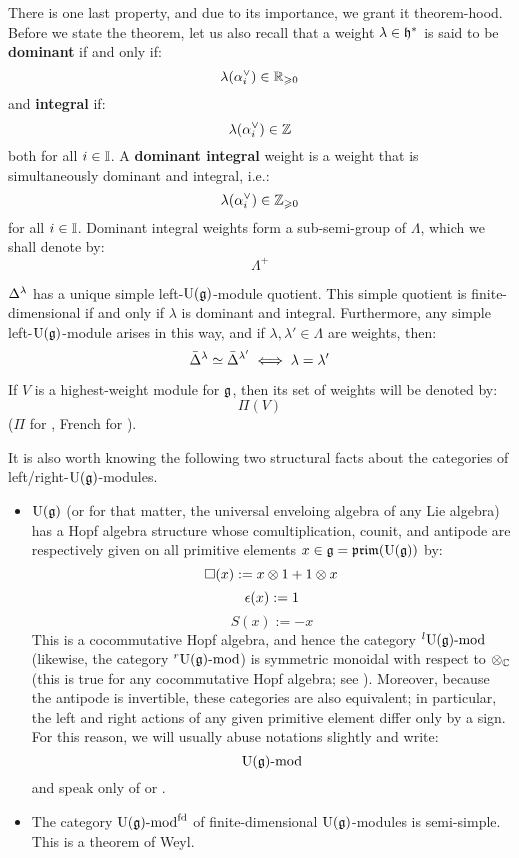         There is one last property, and due to its importance, we grant it theorem-hood. Before we state the theorem, let us also recall that a weight $\lambda \in \mathfrak{h}^*$ is said to be \textbf{dominant} if and only if:
            $$\lambda(\alpha_i^{\vee}) \in \mathbb{R}_{\geqslant 0}$$
        and \textbf{integral} if:
            $$\lambda(\alpha_i^{\vee}) \in \mathbb{Z}$$
        both for all $i \in \mathbb{I}$. A \textbf{dominant integral} weight is a weight that is simultaneously dominant and integral, i.e.:
            $$\lambda(\alpha_i^{\vee}) \in \mathbb{Z}_{\geqslant 0}$$
        for all $i \in \mathbb{I}$. Dominant integral weights form a sub-semi-group of $\Lambda$, which we shall denote by:
            $$\Lambda^+$$
        \begin{theorem} \label{theorem: classification_of_finite_dimensional_simple_modules_over_finite_dimensional_simple_lie_algebras}
            $\Delta^{\lambda}$ has a unique simple left-$\mathrm{U}(\mathfrak{g})$-module quotient. This simple quotient is finite-dimensional if and only if $\lambda$ is dominant and integral. Furthermore, any simple left-$\mathrm{U}(\mathfrak{g})$-module arises in this way, and if $\lambda, \lambda' \in \Lambda$ are weights, then:
                $$\bar{\Delta}^{\lambda} \simeq \bar{\Delta}^{\lambda'} \iff \lambda = \lambda'$$
        \end{theorem}

        If $V$ is a highest-weight module for $\mathfrak{g}$, then its set of weights will be denoted by:
            $$\Pi(V)$$
        ($\Pi$ for , French for ). 

        It is also worth knowing the following two structural facts about the categories of left/right-$\mathrm{U}(\mathfrak{g})$-modules.
        \begin{itemize}
            \item $\mathrm{U}(\mathfrak{g})$ (or for that matter, the universal enveloing algebra of any Lie algebra) has a Hopf algebra structure whose comultiplication, counit, and antipode are respectively given on all primitive elements $x \in \mathfrak{g} = \mathfrak{prim}(\mathrm{U}(\mathfrak{g}))$ by:
                $$\Box(x) := x \tensor 1 + 1 \tensor x$$
                $$\epsilon(x) := 1$$
                $$S(x) := -x$$
            This is a cocommutative Hopf algebra, and hence the category ${}^l\mathrm{U}(\mathfrak{g})\text{-}\mathrm{mod}$ (likewise, the category ${}^r\mathrm{U}(\mathfrak{g})\text{-}\mathrm{mod}$) is symmetric monoidal with respect to $\tensor_{\bbC}$ (this is true for any cocommutative Hopf algebra; see \cite[Proposition III.5.1]{kassel_quantum_groups}). Moreover, because the antipode is invertible, these categories are also equivalent; in particular, the left and right actions of any given primitive element differ only by a sign. For this reason, we will usually abuse notations slightly and write:
                $$\mathrm{U}(\mathfrak{g})\text{-}\mathrm{mod}$$
            and speak only of  or .
            \item The category $\mathrm{U}(\mathfrak{g})\text{-}\mathrm{mod}^{\mathrm{fd}}$ of finite-dimensional $\mathrm{U}(\mathfrak{g})$-modules is semi-simple. This is a theorem of Weyl.
        \end{itemize} 

